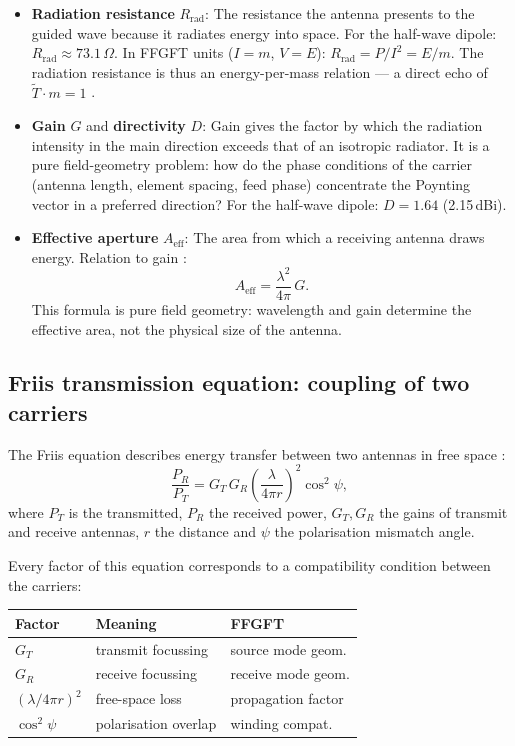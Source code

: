 \begin{itemize}[nosep]
\item \textbf{Radiation resistance} $R_\mathrm{rad}$: The resistance the
  antenna presents to the guided wave because it radiates energy into space.
  For the half-wave dipole: $R_\mathrm{rad} \approx 73.1\,\Omega$.
  In FFGFT units ($I=m$, $V=E$): $R_\mathrm{rad} = P/I^2 = E/m$.
  The radiation resistance is thus an energy-per-mass relation --- a direct
  echo of $\tilde{T}\cdot m=1$ \SM.

\item \textbf{Gain} $G$ and \textbf{directivity} $D$: Gain gives the factor
  by which the radiation intensity in the main direction exceeds that of an
  isotropic radiator. It is a pure field-geometry problem: how do the phase
  conditions of the carrier (antenna length, element spacing, feed phase)
  concentrate the Poynting vector in a preferred direction? For the half-wave
  dipole: $D = 1.64$ (2.15\,dBi).

\item \textbf{Effective aperture} $A_\mathrm{eff}$: The area from which a
  receiving antenna draws energy. Relation to gain \EM:
  \[
    A_\mathrm{eff} = \frac{\lambda^2}{4\pi}\,G.
  \]
  This formula is pure field geometry: wavelength and gain determine the
  effective area, not the physical size of the antenna.
\end{itemize}

\subsection*{Friis transmission equation: coupling of two carriers}

The Friis equation describes energy transfer between two antennas in free
space \cite{Friis1946,Balanis2016}:
\[
  \frac{P_R}{P_T} = G_T\,G_R\left(\frac{\lambda}{4\pi r}\right)^2
  \cos^2\psi,
\]
where $P_T$ is the transmitted, $P_R$ the received power, $G_T, G_R$ the
gains of transmit and receive antennas, $r$ the distance and $\psi$ the
polarisation mismatch angle.

Every factor of this equation corresponds to a compatibility condition
between the carriers:

\begin{center}
\begin{tabular}{@{}lp{2.8cm}p{2.8cm}@{}}
\toprule
\textbf{Factor} & \textbf{Meaning} & \textbf{FFGFT} \\
\midrule
$G_T$ & transmit focussing & source mode geom. \\
$G_R$ & receive focussing & receive mode geom. \\
$(\lambda/4\pi r)^2$ & free-space loss & propagation factor \\
$\cos^2\psi$ & polarisation overlap & winding compat. \\
\bottomrule
\end{tabular}
\end{center}

